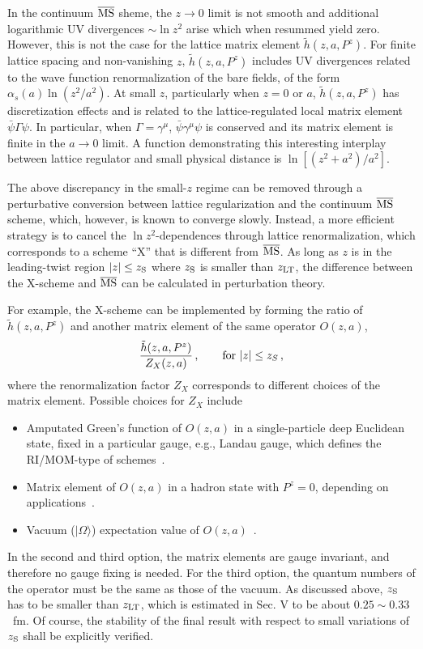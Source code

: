 \documentclass[preprint,12pt]{elsarticle}
\newcommand{\MS}{{\overline{\rm MS}}}
\begin{document}
In the continuum $\MS$ sheme, the $z\rightarrow 0$ limit is not smooth and
additional logarithmic UV divergences $\sim \ln z^2$ arise which
when resummed yield zero.  However, this is not the case for the lattice matrix element
$\tilde h(z,a, P^z)$. For finite lattice spacing and non-vanishing $z$,
$\tilde h(z,a, P^z)$ includes UV divergences related to the wave function
renormalization of the bare fields, of the form
$\alpha_s(a)\ln (z^2/a^2)$.
At small $z$, particularly when $z=0$ or $a$, $\tilde h(z,a, P^z)$ has discretization effects
and is related to the
lattice-regulated local matrix element ${\bar\psi}\Gamma \psi$.
In particular, when $\Gamma=\gamma^\mu$,
${\bar\psi}\gamma^\mu \psi$ is conserved and its matrix element is finite
in the $a\to 0$ limit. A function demonstrating this interesting
interplay between lattice regulator and small physical distance
is $\ln [(z^2+a^2)/a^2]$.

The above discrepancy in the small-$z$ regime can be removed through a perturbative conversion between lattice regularization and the continuum $\MS$ scheme, which, however, is known to converge slowly. Instead, a more efficient strategy is to cancel the $\ln z^2$-dependences through lattice renormalization, which corresponds to a scheme ``X'' that is different from $\MS$.
As long as $z$ is in the leading-twist region $|z|\le z_{\rm S}$ where $z_{\rm S}$ is
smaller than $z_{\rm LT}$, the difference between the X-scheme and $\MS$ can be calculated in perturbation theory.

For example, the X-scheme can be implemented by forming the ratio of $\tilde h(z,a, P^z)$ and another
matrix element of the same operator $O(z,a)$,
\begin{align}\label{eq:ratio}
 \frac{\tilde h(z,a,P^z)}{Z_X(z,a)}\,,~~~~~~{\rm for\ }|z|\le z_{S}\,,
\end{align}
where the renormalization factor $Z_X$ corresponds to different choices of the matrix element.
Possible choices for $Z_X$ include
\begin{itemize}
\item{Amputated Green's function of $O(z,a)$ in a single-particle deep Euclidean state, fixed in a particular gauge, e.g., Landau gauge, which defines the RI/MOM-type of schemes~\cite{Constantinou:2017sej,Stewart:2017tvs,Alexandrou:2017huk,Chen:2017mzz}.}
\item{Matrix element of $O(z,a)$ in a hadron state with $P^z=0$, depending on applications~\cite{Radyushkin:2017cyf,Orginos:2017kos}.}
\item{Vacuum ($|\Omega\rangle$) expectation value of $O(z,a)$~\cite{Braun:2018brg,Li:2020xml}.}
\end{itemize}
In the second and third option, the matrix elements are gauge invariant,
and therefore no gauge fixing is needed. For the third option, the quantum numbers of the operator must be the same as those of the vacuum.
As discussed above, $z_{\rm S}$ has to be smaller than $z_{\rm LT}$, which is estimated in Sec. V to be about
$0.25 \sim 0.33$~fm. Of course, the stability of the final result with respect to small variations of $z_{\rm S}$ shall be explicitly verified.
\end{document}
